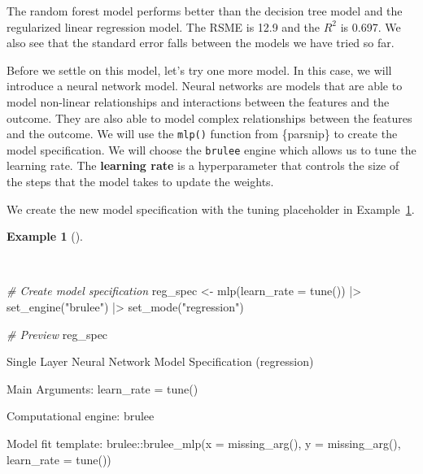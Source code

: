 \documentclass[
  letterpaper,
]{book}
\newenvironment{Shaded}{\begin{snugshade}}{\end{snugshade}}
\newcommand{\AttributeTok}[1]{\textcolor[rgb]{0.00,0.00,0.00}{#1}}
\newcommand{\CommentTok}[1]{\textcolor[rgb]{0.00,0.00,0.00}{\textit{#1}}}
\newcommand{\FunctionTok}[1]{\textcolor[rgb]{0.00,0.00,0.00}{#1}}
\newcommand{\NormalTok}[1]{\textcolor[rgb]{0.00,0.00,0.00}{#1}}
\newcommand{\OtherTok}[1]{\textcolor[rgb]{0.00,0.00,0.00}{#1}}
\newcommand{\SpecialCharTok}[1]{\textcolor[rgb]{0.00,0.00,0.00}{#1}}
\newcommand{\StringTok}[1]{\textcolor[rgb]{0.00,0.00,0.00}{#1}}
\theoremstyle{definition}
\newtheorem{example}{Example}[chapter]
\theoremstyle{remark}
\begin{document}
The random forest model performs better than the decision tree model and
the regularized linear regression model. The RSME is 12.9 and the
\(R^2\) is 0.697. We also see that the standard error falls between the
models we have tried so far.

Before we settle on this model, let's try one more model. In this case,
we will introduce a neural network model. Neural networks are models
that are able to model non-linear relationships and interactions between
the features and the outcome. They are also able to model complex
relationships between the features and the outcome. We will use the
\texttt{mlp()} function from \{parsnip\} to create the model
specification. We will choose the \texttt{brulee} engine which allows us
to tune the learning rate. The \textbf{learning rate} is a
hyperparameter that controls the size of the steps that the model takes
to update the weights.

We create the new model specification with the tuning placeholder in
Example~\ref{exm-predict-reg-model-spec-mlp}.

\begin{example}[]\protect\hypertarget{exm-predict-reg-model-spec-mlp}{}\label{exm-predict-reg-model-spec-mlp}

~

\begin{Shaded}
\begin{Highlighting}[]
\CommentTok{\# Create model specification}
\NormalTok{reg\_spec }\OtherTok{\textless{}{-}}
  \FunctionTok{mlp}\NormalTok{(}\AttributeTok{learn\_rate =} \FunctionTok{tune}\NormalTok{()) }\SpecialCharTok{|\textgreater{}}
  \FunctionTok{set\_engine}\NormalTok{(}\StringTok{"brulee"}\NormalTok{) }\SpecialCharTok{|\textgreater{}}
  \FunctionTok{set\_mode}\NormalTok{(}\StringTok{"regression"}\NormalTok{)}

\CommentTok{\# Preview}
\NormalTok{reg\_spec}
\end{Highlighting}
\end{Shaded}

\begin{Shaded}
\begin{Highlighting}[]
\NormalTok{Single Layer Neural Network Model Specification (regression)}

\NormalTok{Main Arguments:}
\NormalTok{  learn\_rate = tune()}

\NormalTok{Computational engine: brulee}

\NormalTok{Model fit template:}
\NormalTok{brulee::brulee\_mlp(x = missing\_arg(), y = missing\_arg(), learn\_rate = tune())}
\end{Highlighting}
\end{Shaded}

\end{example}
\end{document}
